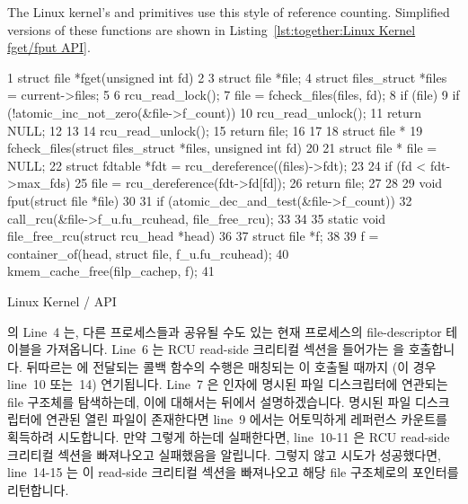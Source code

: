 The Linux kernel's  and  primitives
use this style of reference counting.
Simplified versions of these functions are shown in
Listing~\ref{lst:together:Linux Kernel fget/fput API}.
\fi

\begin{listing}[tbp]
{ \fontsize{6.5pt}{7.5pt}\selectfont
\begin{verbbox}
  1 struct file *fget(unsigned int fd)
  2 {
  3   struct file *file;
  4   struct files_struct *files = current->files;
  5
  6   rcu_read_lock();
  7   file = fcheck_files(files, fd);
  8   if (file) {
  9     if (!atomic_inc_not_zero(&file->f_count)) {
 10       rcu_read_unlock();
 11       return NULL;
 12     }
 13   }
 14   rcu_read_unlock();
 15   return file;
 16 }
 17
 18 struct file *
 19 fcheck_files(struct files_struct *files, unsigned int fd)
 20 {
 21   struct file * file = NULL;
 22   struct fdtable *fdt = rcu_dereference((files)->fdt);
 23
 24   if (fd < fdt->max_fds)
 25     file = rcu_dereference(fdt->fd[fd]);
 26   return file;
 27 }
 28
 29 void fput(struct file *file)
 30 {
 31   if (atomic_dec_and_test(&file->f_count))
 32     call_rcu(&file->f_u.fu_rcuhead, file_free_rcu);
 33 }
 34
 35 static void file_free_rcu(struct rcu_head *head)
 36 {
 37   struct file *f;
 38
 39   f = container_of(head, struct file, f_u.fu_rcuhead);
 40   kmem_cache_free(filp_cachep, f);
 41 }
\end{verbbox}
}
\centering
\theverbbox
\caption{Linux Kernel / API}
\label{lst:together:Linux Kernel fget/fput API}
\end{listing}

 의 Line~4 는, 다른 프로세스들과 공유될 수도 있는 현재 프로세스의
file-descriptor 테이블을 가져옵니다.
Line~6 는 RCU read-side 크리티컬 섹션을 들어가는  을
호출합니다.
뒤따르는  에 전달되는 콜백 함수의 수행은 매칭되는
 이 호출될 때까지 (이 경우 line~10 또는~14) 연기됩니다.
Line~7 은  인자에 명시된 파일 디스크립터에 연관되는 file 구조체를
탐색하는데, 이에 대해서는 뒤에서 설명하겠습니다.
명시된 파일 디스크립터에 연관된 열린 파일이 존재한다면 line~9 에서는 어토믹하게
레퍼런스 카운트를 획득하려 시도합니다.
만약 그렇게 하는데 실패한다면, line~10-11 은 RCU read-side 크리티컬 섹션을
빠져나오고 실패했음을 알립니다.
그렇지 않고 시도가 성공했다면, line~14-15 는 이 read-side 크리티컬 섹션을
빠져나오고 해당 file 구조체로의 포인터를 리턴합니다.
\iffalse

